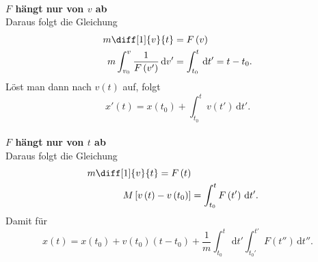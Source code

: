 \documentclass[a4paper,12pt]{article}
\newcommand{\td}{\,\text{d}}
\numberwithin{equation}{section}
\begin{document}
\hfill\\\textbf{$F$ hängt nur von $v$ ab}\\ 
Daraus folgt die Gleichung
\begin{align*}
        m\diff[1]{v}{t}&=F\left(v\right)\\
        m\int_{v_0}^{v}\dfrac{1}{F\left(v'\right)}\td v'&=\int_{t_0}^{t}\td t'=t-t_0
.\end{align*}
Löst man dann nach $v\left(t\right)$ auf, folgt
\[ 
        x'\left(t\right)=x\left(t_0\right)+\int_{t_0}^{t}v\left(t'\right)\td t'
.\] 
\hfill\\\textbf{$F$ hängt nur von $t$ ab}\\ 
Daraus folgt die Gleichung
\begin{align*}
        m\diff[1]{v}{t}=F\left(t\right)\\
        M\left[v\left(t\right)-v\left(t_0\right)\right]&=\int_{t_0}^{t}F\left(t'\right)\td t'
.\end{align*}
Damit für 
\[ 
        x\left(t\right)=x\left(t_0\right)+v\left(t_0\right)\left(t-t_0\right)+\dfrac{1}{m}\int_{t_0}^{t}\td t'\int_{t_0'}^{t'}F\left(t''\right)\td t''
.\] 
\end{document}
